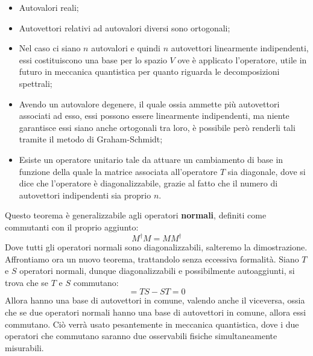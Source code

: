 \begin{itemize}
    \item Autovalori reali;
    \item Autovettori relativi ad autovalori diversi sono ortogonali;
    \item Nel caso ci siano $n$ autovalori e quindi $n$ autovettori linearmente indipendenti, essi costituiscono una base per lo spazio $V$ ove è applicato l'operatore, utile in futuro in meccanica quantistica per quanto riguarda le decomposizioni spettrali;
    \item Avendo un autovalore degenere, il quale ossia ammette più autovettori associati ad esso, essi possono essere linearmente indipendenti, ma niente garantisce essi siano anche ortogonali tra loro, è possibile però renderli tali tramite il metodo di Graham-Schmidt;
    \item Esiste un operatore unitario tale da attuare un cambiamento di base in funzione della quale la matrice associata all'operatore $T$ sia diagonale, dove si dice che l'operatore è diagonalizzabile, grazie al fatto che il numero di autovettori indipendenti sia proprio $n$.
\end{itemize}
Questo teorema è generalizzabile agli operatori \textbf{normali}, definiti come commutanti con il proprio aggiunto:
\begin{equation}
    \label{def:op-normale}
    M^{\dagger}M = MM^{\dagger}
\end{equation}
Dove tutti gli operatori normali sono diagonalizzabili, salteremo la dimostrazione. Affrontiamo ora un nuovo teorema, trattandolo senza eccessiva formalità. Siano $T$ e $S$ operatori normali, dunque diagonalizzabili e possibilmente autoaggiunti, si trova che se $T$ e $S$ commutano:
\begin{equation*}
    [T,S] = TS - ST = 0
\end{equation*}
Allora hanno una base di autovettori in comune, valendo anche il viceversa, ossia che se due operatori normali hanno una base di autovettori in comune, allora essi commutano. Ciò verrà usato pesantemente in meccanica quantistica, dove i due operatori che commutano saranno due osservabili fisiche simultaneamente misurabili.

